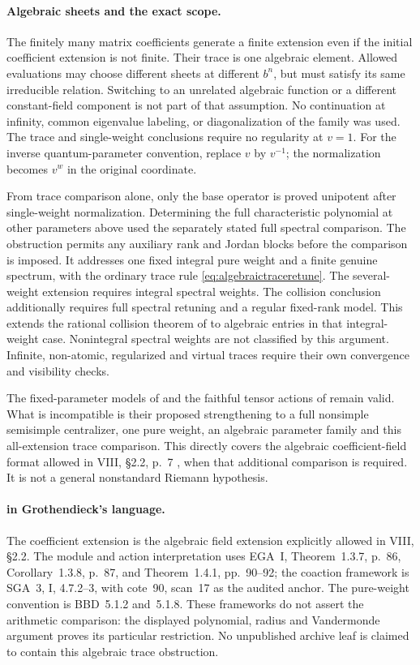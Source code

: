 \paragraph{Algebraic sheets and the exact scope.}
The finitely many matrix coefficients generate a finite
extension even if the initial coefficient extension is
not finite. Their trace is one algebraic element.
Allowed evaluations may choose different sheets at
different $b^n$, but must satisfy its same irreducible
relation. Switching to an unrelated algebraic function
or a different constant-field component is not part
of that assumption.
No continuation at infinity, common eigenvalue labeling,
or diagonalization of the family was used.
The trace and single-weight conclusions require no
regularity at $v=1$.
For the inverse quantum-parameter convention, replace
$v$ by $v^{-1}$; the normalization becomes $v^w$
in the original coordinate.

From trace comparison alone, only the base operator
is proved unipotent after single-weight normalization.
Determining the full characteristic polynomial at
other parameters above used the separately stated
full spectral comparison.
The obstruction permits any auxiliary rank and Jordan
blocks before the comparison is imposed.
It addresses one fixed integral pure weight and a
finite genuine spectrum, with the ordinary trace
rule \eqref{eq:algebraictraceretune}.
The several-weight extension requires integral spectral
weights. The collision conclusion additionally requires
full spectral retuning and a regular fixed-rank model.
This extends the rational collision theorem of
 to algebraic entries in that integral-weight
case. Nonintegral spectral weights are not classified
by this argument.
Infinite, non-atomic, regularized and virtual traces
require their own convergence and visibility checks.

The fixed-parameter models of  and the
faithful tensor actions of  remain valid.
What is incompatible is their proposed strengthening
to a full nonsimple semisimple centralizer, one pure
weight, an algebraic parameter family and this
all-extension trace comparison.
This directly covers the algebraic coefficient-field
format allowed in VIII, \S2.2, p.~7 \cite{VIII},
when that additional comparison is required.
It is not a general nonstandard Riemann hypothesis.

\paragraph{ in Grothendieck's language.}
The coefficient extension is the algebraic field
extension explicitly allowed in VIII, \S2.2.
The module and action interpretation uses EGA~I,
Theorem~1.3.7, p.~86, Corollary~1.3.8, p.~87, and
Theorem~1.4.1, pp.~90--92; the coaction framework is
SGA~3, I, 4.7.2--3, with cote~90, scan~17 as the
audited anchor.
The pure-weight convention is BBD~5.1.2 and~5.1.8.
These frameworks do not assert the arithmetic
comparison: the displayed polynomial, radius and
Vandermonde argument proves its particular restriction.
No unpublished archive leaf is claimed to contain
this algebraic trace obstruction.

